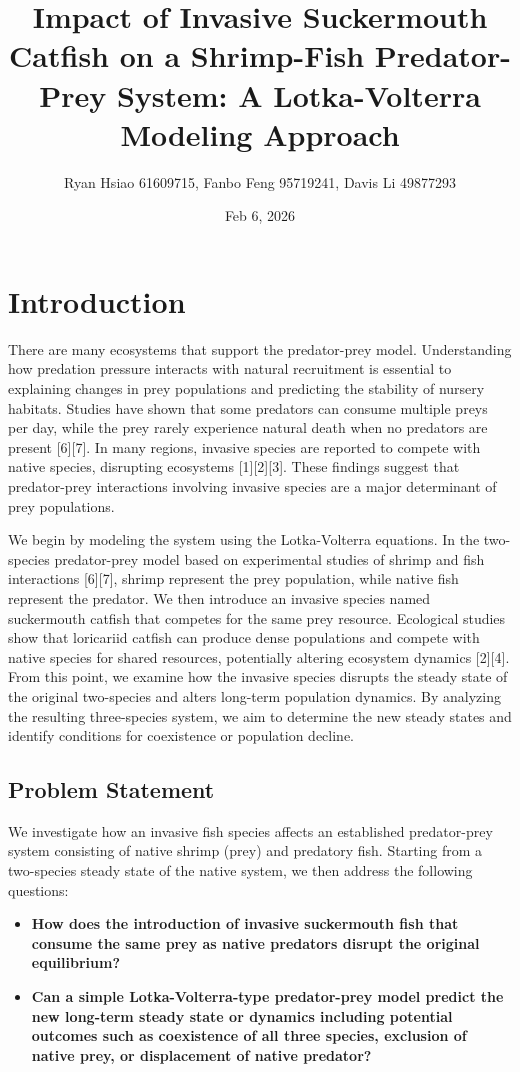 \documentclass{article}
\title{Impact of Invasive Suckermouth Catfish on a Shrimp-Fish Predator-Prey System: A Lotka-Volterra Modeling Approach}
\author{Ryan Hsiao 61609715, Fanbo Feng 95719241, Davis Li 49877293}
\date{Feb 6, 2026}   %
\begin{document}
\maketitle 

\section{Introduction} %
There are many ecosystems that support the predator-prey model. Understanding how predation pressure interacts with natural recruitment is essential to explaining changes in prey populations and predicting the stability of nursery habitats. Studies have shown that some predators can consume multiple preys per day, while the prey rarely experience natural death when no predators are present [6][7]. In many regions, invasive species are reported to compete with native species, disrupting ecosystems [1][2][3]. These findings suggest that predator-prey interactions involving invasive species are a major determinant of prey populations.

\vspace{5mm}

\noindent We begin by modeling the system using the Lotka-Volterra equations. In the two-species predator-prey model based on experimental studies of shrimp and fish interactions [6][7], shrimp represent the prey population, while native fish represent the predator. We then introduce an invasive species named suckermouth catfish that competes for the same prey resource. Ecological studies show that loricariid catfish can produce dense populations and compete with native species for shared resources, potentially altering ecosystem dynamics [2][4]. From this point, we examine how the invasive species disrupts the steady state of the original two-species and alters long-term population dynamics. By analyzing the resulting three-species system, we aim to determine the new steady states and identify conditions for coexistence or population decline.

\subsection*{Problem Statement}
We investigate how an invasive fish species affects an established predator-prey system consisting of native shrimp (prey) and predatory fish. Starting from a two-species steady state of the native system, we then address the following questions:
\begin{itemize}
\item \textbf{How does the introduction of invasive suckermouth fish that consume the same prey as native predators disrupt the original equilibrium?}
\item \textbf{Can a simple Lotka-Volterra-type predator-prey model predict the new long-term steady state or dynamics including potential outcomes such as coexistence of all three species, exclusion of native prey, or displacement of native predator?}
\end{itemize}
\end{document}

